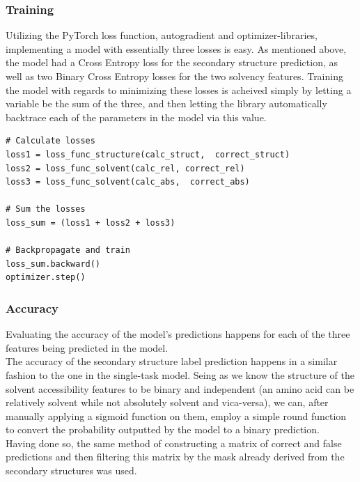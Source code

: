 \begin{multicols}{2}
\subsubsection{Training}
Utilizing the PyTorch loss function, autogradient and optimizer-libraries, implementing a model with essentially three losses is easy. As mentioned above, the model had a Cross Entropy loss for the secondary structure prediction, as well as two Binary Cross Entropy losses for the two solvency features. Training the model with regards to minimizing these losses is acheived simply by letting a variable be the sum of the three, and then letting the library automatically backtrace each of the parameters in the model via this value.
\begin{lstlisting}
# Calculate losses
loss1 = loss_func_structure(calc_struct,  correct_struct)
loss2 = loss_func_solvent(calc_rel, correct_rel)
loss3 = loss_func_solvent(calc_abs,  correct_abs)

# Sum the losses
loss_sum = (loss1 + loss2 + loss3)

# Backpropagate and train
loss_sum.backward()
optimizer.step()
\end{lstlisting}


\subsubsection{Accuracy}
Evaluating the accuracy of the model's predictions happens for each of the three features being predicted in the model.\\
The accuracy of the secondary structure label prediction happens in a similar fashion to the one in the single-task model. Seing as we know the structure of the solvent accessibility features to be binary and independent (an amino acid can be relatively solvent while not absolutely solvent and vica-versa), we can, after manually applying a sigmoid function on them, employ a simple round function to convert the probability outputted by the model to a binary prediction.\\
Having done so, the same method of constructing a matrix of correct and false predictions and then filtering this matrix by the mask already derived from the secondary structures was used.



\end{multicols}
